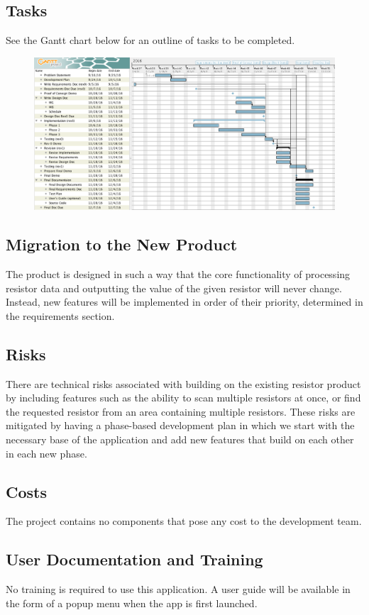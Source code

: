 \documentclass{article}
\begin{document}
\subsection{Tasks}
See the Gantt chart below for an outline of tasks to be completed.
\begin{figure}[h]
\centering
\includegraphics[scale=0.3]{gantt}
\end{figure}

\subsection{Migration to the New Product}
The product is designed in such a way that the core functionality of processing resistor data and outputting the value of the given resistor will never change. Instead, new features will be implemented in order of their priority, determined in the requirements section.

\subsection{Risks}
There are technical risks associated with building on the existing resistor product by including features such as the ability to scan multiple resistors at once, or find the requested resistor from an area containing multiple resistors. These risks are mitigated by having a phase-based development plan in which we start with the necessary base of the application and add new features that build on each other in each new phase.

\subsection{Costs}
The project contains no components that pose any cost to the development team.

\subsection{User Documentation and Training}
No training is required to use this application. A user guide will be available in the form of a popup menu when the app is first launched.
\end{document}
